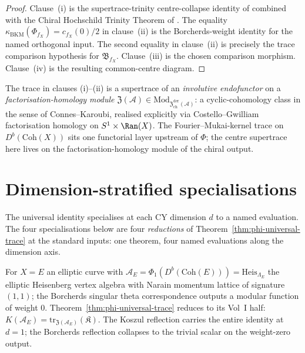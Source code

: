 \begin{proof}
Clause~(i) is the supertrace-trinity centre-collapse identity of
\cite{VolI} combined with the Chiral Hochschild Trinity Theorem of
\cite{VolII}.  The equality
\(\kappa_{\mathrm{BKM}}(\Phi_{f_X})=c_{f_X}(0)/2\) in clause~(ii) is
the Borcherds-weight identity for the named orthogonal input.  The
second equality in clause~(ii) is precisely the trace comparison
hypothesis for \(\mathfrak B_{f_X}\).  Clause~(iii) is the chosen
comparison morphism.  Clause~(iv) is the resulting common-centre
diagram.
\end{proof}

\begin{remark}
\label{rem:phi-trace-object}
The trace in clauses (i)--(ii) is a supertrace of an \emph{involutive
endofunctor} on a \emph{factorisation-homology module}
$\mathfrak{Z}(\mathcal{A}) \in \mathrm{Mod}_{\mathfrak{Z}^{\mathrm{der}}_{\mathrm{ch}}(\mathcal{A})}$:
a cyclic-cohomology class in the sense of Connes--Karoubi, realised
explicitly via Costello--Gwilliam factorisation homology on
$S^1 \times \Ran(X)$. The Fourier--Mukai-kernel trace on
$D^b(\mathrm{Coh}(X))$ sits one functorial layer upstream of $\Phi$;
the centre supertrace here lives on the factorisation-homology module
of the chiral output.
\end{remark}

\section{Dimension-stratified specialisations}
\label{sec:phi-trace-stratification}

The universal identity specialises at each CY dimension $d$ to a
named evaluation. The four specialisations below are four
\emph{reductions} of Theorem~\ref{thm:phi-universal-trace} at the
standard inputs: one theorem, four named evaluations along the
dimension axis.

\begin{corollary}[\texorpdfstring{$d = 1$}{d = 1}: the Vol~I half alone]
\label{cor:phi-trace-d1}
For $X = E$ an elliptic curve with
$\mathcal{A}_E = \Phi_1(D^b(\mathrm{Coh}(E))) = \mathrm{Heis}_{\Lambda_E}$
the elliptic Heisenberg vertex algebra with Narain momentum lattice of
signature $(1, 1)$; the
Borcherds singular theta correspondence outputs a modular function of
weight $0$. Theorem~\ref{thm:phi-universal-trace} reduces to its
Vol~I half:
$K(\mathcal{A}_E) = \mathrm{tr}_{\mathfrak{Z}(\mathcal{A}_E)}(\mathfrak{K})$.
The Koszul reflection carries the entire identity at $d = 1$; the
Borcherds reflection collapses to the trivial scalar on the
weight-zero output.
\end{corollary}

